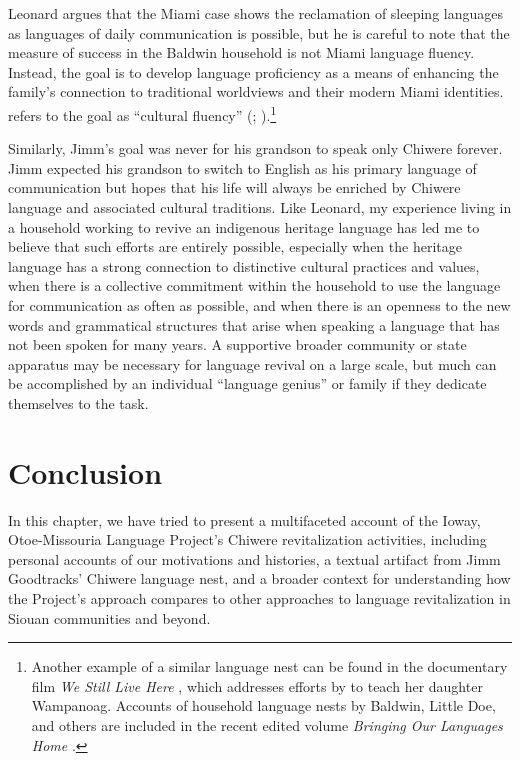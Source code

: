 \documentclass[output=paper]{LSP/langsci}
\begin{document}
Leonard argues that the Miami case shows the reclamation of sleeping languages as languages of daily communication is possible, but he is careful to note that the measure of success in the Baldwin household is not Miami language fluency. Instead, the goal is to develop language proficiency as a means of enhancing the family's connection to traditional worldviews and their modern Miami identities.  refers to the goal as ``cultural fluency'' (\citealt[36--37]{Leonard2007}; \citeyear[139--140]{Leonard2011}).\footnote{Another example of a similar language nest can be found in the documentary film \emph{We Still Live Here} \citep{Makepeace2011}, which addresses efforts by  to teach her daughter Wampanoag. Accounts of household language nests by Baldwin, Little Doe, and others are included in the recent edited volume \emph{Bringing Our Languages Home} \citep{Hinton 2013}.} 

Similarly, Jimm's goal was never for his grandson to speak only Chiwere forever. Jimm expected his grandson to switch to English as his primary language of communication but hopes that his life will always be enriched by Chiwere language and associated cultural traditions. Like Leonard, my experience living in a household working to revive an indigenous heritage language has led me to believe that such efforts are entirely possible, especially when the heritage language has a strong connection to distinctive cultural practices and values, when there is a collective commitment within the household to use the language for communication as often as possible, and when there is an openness to the new words and grammatical structures that arise when speaking a language that has not been spoken for many years. A supportive broader community or state apparatus may be necessary for language revival on a large scale, but much can be accomplished by an individual ``language genius'' or family if they dedicate themselves to the task.

\section{Conclusion}
In this chapter, we have tried to present a multifaceted account of the Ioway, Otoe-Missouria Language Project's Chiwere revitalization activities, including personal accounts of our motivations and histories, a textual artifact from Jimm Goodtracks' Chiwere language nest, and a broader context for understanding how the Project's approach compares to other approaches to language revitalization in Siouan communities and beyond.
\end{document}
